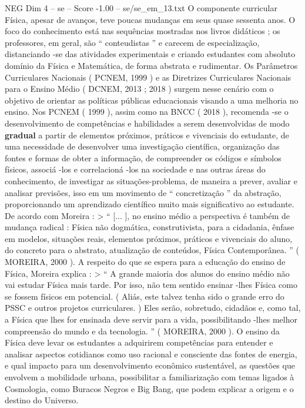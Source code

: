 \begin{textsample}{NEG Dim 4 – se – Score -1.00 – se/se\_em\_13.txt}
O componente curricular Física, apesar de avanços, teve poucas mudanças em seus quase sessenta anos.
O foco do conhecimento está nas sequências mostradas nos livros didáticos ; os professores, em geral, são “ conteudistas ” e carecem de especialização, distanciando -se das atividades experimentais e criando estudantes com absoluto domínio da Física e Matemática, de forma abstrata e rudimentar.
Os Parâmetros Curriculares Nacionais ( PCNEM, 1999 ) e as Diretrizes Curriculares Nacionais para o Ensino Médio ( DCNEM, 2013 ; 2018 ) surgem nesse cenário com o objetivo de orientar as políticas públicas educacionais visando a uma melhoria no ensino.
Nos PCNEM ( 1999 ), assim como na BNCC ( 2018 ), recomenda -se o desenvolvimento de competências e habilidades a serem desenvolvidas de modo \textbf{gradual} a partir de elementos próximos, práticos e vivenciais do estudante, de uma necessidade de desenvolver uma investigação científica, organização das fontes e formas de obter a informação, de compreender os códigos e símbolos físicos, associá -los e correlacioná -los na sociedade e nas outras áreas do conhecimento, de investigar as situações-problema, de maneira a prever, avaliar e analisar previsões, isso em um movimento de “ concretização ” da abstração, proporcionando um aprendizado científico muito mais significativo ao estudante.
De acordo com Moreira : > “ [... ], no ensino médio a perspectiva é também de mudança radical : Física não dogmática, construtivista, para a cidadania, ênfase em modelos, situações reais, elementos próximos, práticos e vivenciais do aluno, do concreto para o abstrato, atualização de conteúdos, Física Contemporânea. ” ( MOREIRA, 2000 ).
A respeito do que se espera para a educação do ensino de Física, Moreira explica : > “ A grande maioria dos alunos do ensino médio não vai estudar Física mais tarde.
Por isso, não tem sentido ensinar -lhes Física como se fossem físicos em potencial. ( Aliás, este talvez tenha sido o grande erro do PSSC e outros projetos curriculares. ) Eles serão, sobretudo, cidadãos e, como tal, a Física que lhes for ensinada deve servir para a vida, possibilitando -lhes melhor compreensão do mundo e da tecnologia. ” ( MOREIRA, 2000 ).
O ensino da Física deve levar os estudantes a adquirirem competências para entender e analisar aspectos cotidianos como uso racional e consciente das fontes de energia, e qual impacto para um desenvolvimento econômico sustentável, as questões que envolvem a mobilidade urbana, possibilitar a familiarização com temas ligados à Cosmologia, como Buracos Negros e Big Bang, que podem explicar a origem e o destino do Universo.

\end{textsample}
